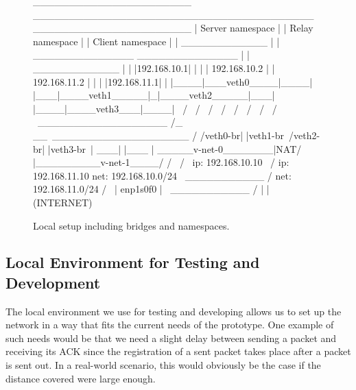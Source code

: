 \vspace{0.5cm}
\begin{figure}[H]
\centering
\begin{myverbatim}
 ______________________         _______________________________________        ______________________
|   Server namespace   |       |            Relay namespace            |      |   Client namespace   |
|     ____________     |       |    ______________   ______________    |      |     ____________     |
|    |192.168.10.1|    |       |   | 192.168.10.2 | | 192.168.11.2 |   |      |    |192.168.11.1|    |
|____|___veth0____|____|       |___|____veth1_____|_|____veth2_____|___|      |____|____veth3___|____|
            \                            /                 \                             /
             \                          /                   \                           /
              \                        /                     \                         /
               \                      /                       \                       /
                \ __________________ /_                      __\ ___________________ /
                /veth0-br|     |veth1-br\                   /veth2-br|      |veth3-br\
                |                    ___|                   |___                     |
                \_____v-net-0_______|NAT/                   \NAT|_________v-net-1____/
                        /              \                     /                \
               ip: 192.168.10.10        \                   /         ip: 192.168.11.10
               net: 192.168.10.0/24      \   ___________   /          net: 192.168.11.0/24
                                           /             \
                                          |   enp1s0f0    |
                                           \ ___________ /
                                                  |
                                                  |
                                              (INTERNET)

\end{myverbatim}
\caption{Local setup including bridges and namespaces.}\label{fig:namespace-setup}
\end{figure}
\vspace{0.5cm}

\subsection{Local Environment for Testing and Development}\label{subsec:namespace_environment}
The local environment we use for testing and developing allows us to set up the network in a way 
that fits the current needs of the prototype.
One example of such needs would be that we need a slight delay between sending a packet and 
receiving its ACK since the registration of a sent packet takes place after a packet 
is sent out. 
In a real-world scenario, this would obviously be the case if the distance covered 
were large enough.

